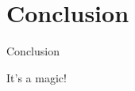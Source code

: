 \section{Conclusion}

\begin{frame}{Conclusion}
  \begin{center}
    \Large{It's a magic!}
  \end{center}
\end{frame}

